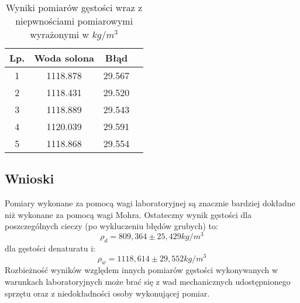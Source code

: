 \documentclass{article} %
\begin{document}
\begin{table}[h!]
\centering
\begin{tabular}{|c|c|c|c|}
\hline
\textbf{Lp.} & \textbf{Woda solona} & \textbf{Błąd} \\
\hline
1 & 1118.878 & 29.567 \\
2 & 1118.431 & 29.520 \\
3 & 1118.889 & 29.543 \\
4 & 1120.039 & 29.591 \\
5 & 1118.868 & 29.554 \\
\hline
\end{tabular}

\caption{Wyniki pomiarów gęstości wraz z niepwnościami pomiarowymi wyrażonymi w $kg/m^3$}
\label{table:students}
\end{table}
\subsection{Wnioski}

Pomiary wykonane za pomocą wagi laboratoryjnej są znacznie bardziej dokładne niż wykonane za pomocą wagi Mohra. Ostateczny wynik gęstości dla poszczególnych cieczy (po wykluczeniu błędów grubych) to:
{\large
\begin{equation}
    \rho_d = 809,364 \pm 25,429kg/m^3
\end{equation}
}
dla gęstości denaturatu i:
{\large
\begin{equation}
    \rho_w = 1118,614 \pm 29,552kg/m^3
\end{equation}
}
Rozbieżność wyników względem innych pomiarów gęstości wykonywanych w warunkach laboratoryjnych może brać się z wad mechanicznych udostępnionego sprzętu oraz z niedokładności osoby wykonującej pomiar.
\end{document}
